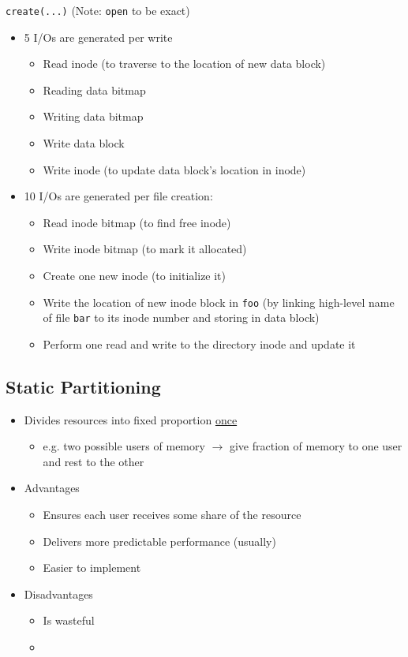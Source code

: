 \documentclass[12pt]{article}
\begin{document}
\texttt{create(...)} (Note: \texttt{open} to be exact)

\bigskip

\begin{itemize}
    \item 5 I/Os are generated per write

    \begin{itemize}
        \item Read inode (to traverse to the location of new data block)
        \item Reading data bitmap
        \item Writing data bitmap
        \item Write data block
        \item Write inode (to update data block's location in inode)
    \end{itemize}
    \item 10 I/Os are generated per file creation:

    \begin{itemize}
        \item Read inode bitmap (to find free inode)
        \item Write inode bitmap (to mark it allocated)
        \item Create one new inode (to initialize it)
        \item Write the location of new inode block in \texttt{foo} (by linking high-level name of file \texttt{bar} to its inode number and storing in data block)
        \item Perform one read and write to the directory inode and update it
    \end{itemize}
\end{itemize}

\subsection{Static Partitioning}

\begin{itemize}
    \item Divides resources into fixed proportion \underline{once}
    \begin{itemize}
        \item e.g. two possible users of memory $\to$ give fraction of memory to one user and
        rest to the other
    \end{itemize}
    \item Advantages
    \begin{itemize}
        \item Ensures each user receives some share of the resource
        \item Delivers more predictable performance (usually)
        \item Easier to implement
    \end{itemize}
    \item Disadvantages
    \begin{itemize}
        \item Is wasteful
        \item
    \end{itemize}
\end{itemize}
\end{document}
